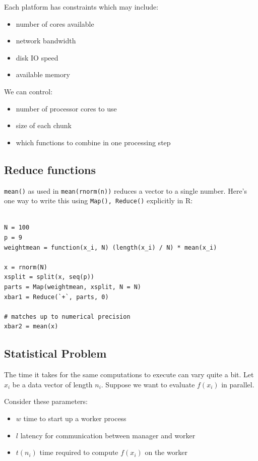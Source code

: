 \documentclass[12pt]{article}
\begin{document}

Each platform has constraints which may include:

\begin{itemize}
    \item number of cores available
    \item network bandwidth
    \item disk IO speed
    \item available memory
\end{itemize}

We can control:

\begin{itemize}
    \item number of processor cores to use
    \item size of each chunk
    \item which functions to combine in one processing step
\end{itemize}


\subsection{Reduce functions}

\texttt{mean()} as used in \texttt{mean(rnorm(n))} reduces a vector to a
single number. Here's one way to write this using \texttt{Map(), Reduce()}
explicitly in R:

\begin{verbatim}

N = 100
p = 9
weightmean = function(x_i, N) (length(x_i) / N) * mean(x_i)

x = rnorm(N)
xsplit = split(x, seq(p))
parts = Map(weightmean, xsplit, N = N)
xbar1 = Reduce(`+`, parts, 0)

# matches up to numerical precision
xbar2 = mean(x)

\end{verbatim}


\subsection{Statistical Problem}

The time it takes for the same computations to execute can vary quite a
bit. Let $x_i$ be a data vector of length $n_i$. Suppose we want to evaluate
$f(x_i)$ in parallel.

Consider these parameters:

\begin{itemize}
    \item $w$ time to start up a worker process
    \item $l$ latency for communication between manager and worker
    \item $t(n_i)$ time required to compute $f(x_i)$ on the worker
\end{itemize}
\end{document}

